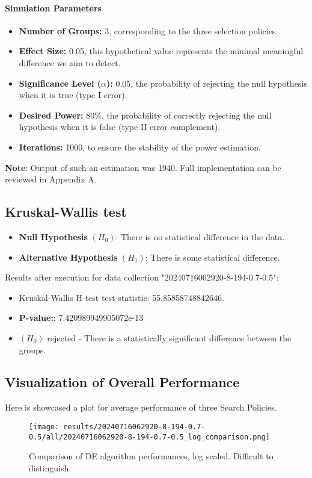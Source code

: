 \documentclass[12pt,a4paper]{article}
\begin{document}
\paragraph{Simulation Parameters}
\begin{itemize}
    \item \textbf{Number of Groups:} 3, corresponding to the three selection policies.
    \item \textbf{Effect Size:} 0.05, this hypothetical value represents the minimal meaningful difference we aim to detect.
    \item \textbf{Significance Level ($\alpha$):} 0.05, the probability of rejecting the null hypothesis when it is true (type I error).
    \item \textbf{Desired Power:} 80\%, the probability of correctly rejecting the null hypothesis when it is false (type II error complement).
    \item \textbf{Iterations:} 1000, to ensure the stability of the power estimation.
\end{itemize}

\textbf{Note}: Output of such an estimation was 1940. Full implementation can be reviewed in Appendix A.

\subsection{Kruskal-Wallis test}
\begin{itemize}
    \item \textbf{Null Hypothesis} $(H_0)$: There is no statistical difference in the data.
    \item \textbf{Alternative Hypothesis} $(H_1)$: There is some statistical difference.
\end{itemize}

Results after execution for data collection "20240716062920-8-194-0.7-0.5":
\begin{itemize}
    \item Kruskal-Wallis H-test test-statistic: 55.85858748842646.
    \item \textbf{P-value:}:  7.420989949905072e-13
    \item $(H_0)$ rejected - There is a statistically significant difference between the groups.
\end{itemize}

\subsection{Visualization of Overall Performance}
Here is showcased a plot for average performance of three Search Policies.
\begin{figure}[h!]
    \centering
    \texttt{[image: results/20240716062920-8-194-0.7-0.5/all/20240716062920-8-194-0.7-0.5\_log\_comparison.png]}
    \caption{Comparison of DE algorithm performances, log scaled. Difficult to distinguish.}
    \label{fig:PerformanceComparison}
\end{figure}
\end{document}
